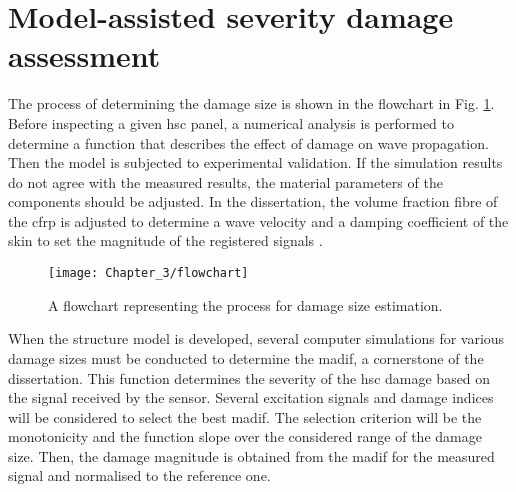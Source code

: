 \section{Model-assisted severity damage assessment }
\label{sec:madif}


The process of determining the damage size is shown in the flowchart in Fig. \ref{fig:Flowchart}.
Before inspecting a given \ac{hsc} panel, a numerical analysis is performed to determine a function that describes the effect of damage on wave propagation.
Then the model is subjected to experimental validation.
If the simulation results do not agree with the measured results, the material parameters of the components should be adjusted.
In the dissertation, the volume fraction fibre of the \ac{cfrp} is adjusted to determine a wave velocity \cite{kudela2007modelling} and a damping coefficient of the skin to set the magnitude of the registered signals \cite{wandowski2017guided}.
\begin{figure}[H]
		\begin{center}
	\texttt{[image: Chapter\_3/flowchart]}
		\end{center}
	\caption{A flowchart representing the process for damage size estimation.}
	\label{fig:Flowchart}
\end{figure}

When the structure model is developed, several computer simulations for various damage sizes must be conducted to determine the \ac{madif}, a cornerstone of the dissertation. This function determines the severity of the \ac{hsc} damage based on the signal received by the sensor.
Several excitation signals and damage indices will be considered to select the best \ac{madif}.
The selection criterion will be the monotonicity and the function slope over the considered range of the damage size. Then, the damage magnitude is obtained from the \ac{madif} for the measured signal and normalised to the reference one.



